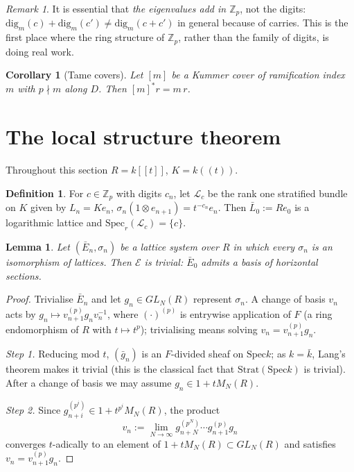 \documentclass[11pt,reqno]{amsart}
\newcommand{\Zp}{\mathbb{Z}_p}
\newcommand{\cE}{\mathcal{E}}
\newcommand{\cL}{\mathcal{L}}
\newcommand{\Strat}{\mathrm{Strat}}
\newcommand{\Spec}{\mathrm{Spec}}
\newcommand{\dig}{\mathrm{dig}}
\theoremstyle{plain}
\newtheorem{lemma}[theorem]{Lemma}
\newtheorem{corollary}[theorem]{Corollary}
\theoremstyle{definition}
\newtheorem{definition}[theorem]{Definition}
\theoremstyle{remark}
\newtheorem{remark}[theorem]{Remark}
\numberwithin{equation}{section}
\begin{document}
\begin{remark}
It is essential that \emph{the eigenvalues add in $\Zp$}, not the digits:
$\dig_m(c)+\dig_m(c')\ne\dig_m(c+c')$ in general because of carries.  This
is the first place where the ring structure of $\Zp$, rather than the
family of digits, is doing real work.
\end{remark}

\begin{corollary}[Tame covers]\label{cor:tame}
Let $[m]$ be a Kummer cover of ramification index $m$ with $p\nmid m$
along $D$.  Then $[m]^*r=m\,r$.
\end{corollary}

\section{The local structure theorem}\label{sec:localstructure}

Throughout this section $R=k[[t]]$, $K=k((t))$.

\begin{definition}
For $c\in\Zp$ with digits $c_n$, let $\cL_c$ be the rank one stratified
bundle on $K$ given by $L_n=K e_n$, $\sigma_n(1\otimes e_{n+1})=t^{-c_n}e_n$.
Then $\bar L_0:=Re_0$ is a logarithmic lattice and
$\mathrm{Spec}_r(\cL_c)=\{c\}$.
\end{definition}

\begin{lemma}\label{lem:mu0}
Let $(\bar E_n,\sigma_n)$ be a lattice system over $R$ in which every
$\sigma_n$ is an isomorphism of lattices.  Then $\cE$ is trivial: $\bar
E_0$ admits a basis of horizontal sections.
\end{lemma}
\begin{proof}
Trivialise $\bar E_n$ and let $g_n\in GL_N(R)$ represent $\sigma_n$.  A
change of basis $v_n$ acts by $g_n\mapsto v_{n+1}^{(p)}g_nv_n^{-1}$, where
$(\cdot)^{(p)}$ is entrywise application of $F$ (a ring endomorphism of
$R$ with $t\mapsto t^p$); trivialising means solving
$v_n=v_{n+1}^{(p)}g_n$.

\emph{Step 1.} Reducing mod $t$, $(\bar g_n)$ is an $F$-divided sheaf on
$\Spec k$; as $k=\bar k$, Lang's theorem makes it trivial (this is the
classical fact that $\Strat(\Spec k)$ is trivial).  After a change of
basis we may assume $g_n\in 1+tM_N(R)$.

\emph{Step 2.} Since $g_{n+i}^{(p^i)}\in1+t^{p^i}M_N(R)$, the product
\[
   v_n:=\lim_{N\to\infty}g_{n+N}^{(p^N)}\cdots g_{n+1}^{(p)}g_n
\]
converges $t$-adically to an element of $1+tM_N(R)\subset GL_N(R)$ and
satisfies $v_n=v_{n+1}^{(p)}g_n$.
\end{proof}
\end{document}
